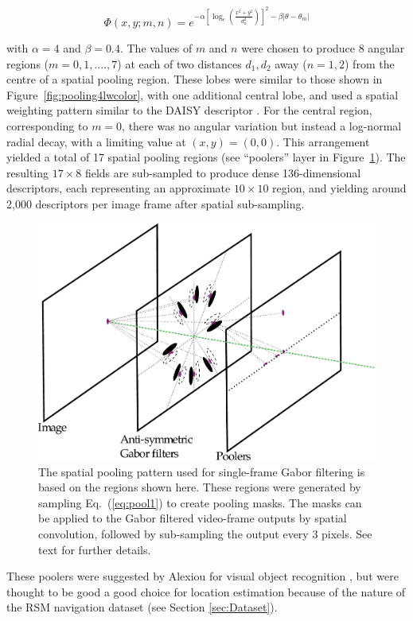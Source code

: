 \begin{equation}
\Phi(x,y;m,n) = e^{-\alpha \left [\log_e \left ( \frac{x^2+y^2}{d_n^2}\right ) \right ]^2 - \beta |\theta-\theta_m | }
\label{eq:pool1}
\end{equation}

\noindent with $\alpha = 4$ and $\beta = 0.4$. The values of $m$ and $n$ were chosen to produce 8 angular regions ($m = 0, 1, ...., 7$) at each of two distances $d_1, d_2$ away ($n=1,2$) from the centre of a spatial pooling region. These lobes were similar to those shown in Figure~\ref{fig:pooling4lwcolor}, with one additional central lobe, and used a spatial weighting pattern similar to the DAISY descriptor \cite{Winder2009}. For the central region, corresponding to $m=0$, there was no angular variation but instead a log-normal radial decay, with a limiting value at $(x,y)=(0,0)$. This arrangement yielded a total of  17 spatial pooling regions (see ``poolers'' layer in Figure~\ref{fig:IsoPool}). The resulting $17 \times 8$ fields are sub-sampled to produce dense 136-dimensional descriptors, each representing an approximate $10 \times 10$ region, and yielding around 2,000 descriptors per image frame after spatial sub-sampling. 

\begin{figure}[t]
\centering
\includegraphics[width=0.7\linewidth]{./gfx/Chapter04/Layers.pdf}
\caption{The spatial pooling pattern used for single-frame Gabor filtering is based on the regions shown here.  These regions were generated by sampling Eq.~(\ref{eq:pool1}) to create pooling masks. The masks can be applied to the Gabor filtered video-frame outputs by spatial convolution, followed by sub-sampling the output every 3 pixels. See text for further details.}
\label{fig:IsoPool}
\end{figure}

These poolers were suggested by Alexiou for visual object recognition \cite{Alexiou2013}, but were thought to be good a good choice for location estimation because of the nature of the RSM navigation dataset (see Section \ref{sec:Dataset}).

